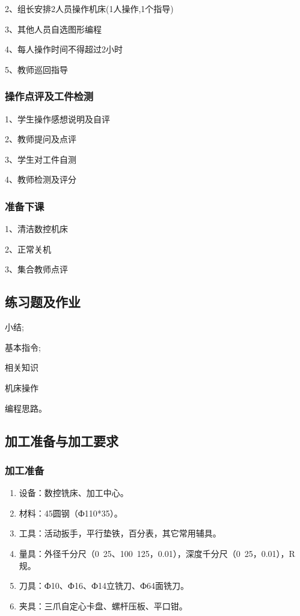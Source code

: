 2、组长安排2人员操作机床(1人操作,1个指导)

3、其他人员自选图形编程

4、每人操作时间不得超过2小时

5、教师巡回指导
\subsubsection{操作点评及工件检测}
1、学生操作感想说明及自评

2、教师提问及点评

3、学生对工件自测

4、教师检测及评分
\subsubsection{准备下课}
1、清洁数控机床

2、正常关机

3、集合教师点评

\subsection{练习题及作业}
\begin{compactenum}[1、]
	\item 小结;
	\item 基本指令;
	\item 相关知识
	\item 机床操作
	\item 编程思路。
\end{compactenum}

\vfill
\subsection{加工准备与加工要求}
\subsubsection{加工准备}
\begin{enumerate}[1、]
\item 设备：数控铣床、加工中心。
\item 材料：45圆钢（Ф110*35）。
\item 工具：活动扳手，平行垫铁，百分表，其它常用辅具。
\item 量具：外径千分尺（0~25、100~125，0.01），深度千分尺（0~25，0.01），R规。
\item 刀具：Ф10、Ф16、Ф14立铣刀、Ф64面铣刀。
\item 夹具：三爪自定心卡盘、螺杆压板、平口钳。
\end{enumerate}
